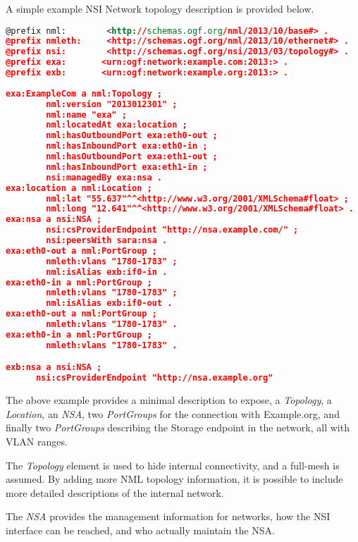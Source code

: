 \documentclass[12pt]{article}  %
\begin{document}
 A simple example NSI Network topology description is provided 
below. 

\begin{lstlisting}[language=XML]
@prefix nml:        <http://schemas.ogf.org/nml/2013/10/base#> .
@prefix nmleth:     <http://schemas.ogf.org/nml/2013/10/ethernet#> .
@prefix nsi:        <http://schemas.ogf.org/nsi/2013/03/topology#> .
@prefix exa:       <urn:ogf:network:example.com:2013:> .
@prefix exb:       <urn:ogf:network:example.org:2013:> .
  
exa:ExampleCom a nml:Topology ;
        nml:version "2013012301" ;
        nml:name "exa" ;
        nml:locatedAt exa:location ;
        nml:hasOutboundPort exa:eth0-out ;
        nml:hasInboundPort exa:eth0-in ;
        nml:hasOutboundPort exa:eth1-out ;
        nml:hasInboundPort exa:eth1-in ;
        nsi:managedBy exa:nsa .
exa:location a nml:Location ;
        nml:lat "55.637"^^<http://www.w3.org/2001/XMLSchema#float> ;
        nml:long "12.641"^^<http://www.w3.org/2001/XMLSchema#float> .
exa:nsa a nsi:NSA ;
        nsi:csProviderEndpoint "http://nsa.example.com/" ;
        nsi:peersWith sara:nsa .
exa:eth0-out a nml:PortGroup ;
        nmleth:vlans "1780-1783" ;
        nml:isAlias exb:if0-in .
exa:eth0-in a nml:PortGroup ;
        nmleth:vlans "1780-1783" ;
        nml:isAlias exb:if0-out .
exa:eth0-out a nml:PortGroup ;
        nmleth:vlans "1780-1783" .
exa:eth0-in a nml:PortGroup ;
        nmleth:vlans "1780-1783" .

exb:nsa a nsi:NSA ;
      nsi:csProviderEndpoint "http://nsa.example.org"
\end{lstlisting}



 The above example provides a minimal description to expose, 
a \emph{Topology}, a \emph{Location}, an \emph{NSA}, two \emph{PortGroups} for the connection with Example.org, 
and finally two \emph{PortGroups} describing the Storage endpoint in the network, all 
with VLAN ranges.

 The \emph{Topology} element is used to hide internal connectivity, and 
a full-mesh is assumed. By adding more NML topology information, it is possible 
to include more detailed descriptions of the internal network.


 The \emph{NSA} provides the management information for networks, how 
the NSI interface can be reached, and who actually maintain the NSA.
\end{document}
